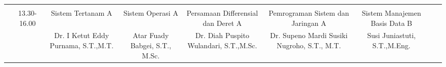 \begin{table}[]
\begin{tabular}{|c|c|ccccccc|}
                          &                              & \multicolumn{1}{c|}{}                                             & \multicolumn{1}{c|}{}                                              & \multicolumn{1}{c|}{}                                         & \multicolumn{1}{c|}{}                                                & \multicolumn{1}{c|}{}                                             & \multicolumn{1}{c|}{}                                              &                                                 \\ \cline{2-9} 
                          & \multirow{2}{*}{13.30-16.00} & \multicolumn{1}{c|}{Sistem Tertanam A}                            & \multicolumn{1}{c|}{Sistem Operasi A}                              & \multicolumn{1}{c|}{Persamaan   Differensial dan Deret A}     & \multicolumn{1}{c|}{Pemrograman Sistem   dan Jaringan A}             & \multicolumn{1}{c|}{Sistem Manajemen   Basis Data B}              & \multicolumn{1}{c|}{}                                              &                                                 \\ \cline{3-9} 
                          &                              & \multicolumn{1}{c|}{Dr. I Ketut Eddy Purnama, S.T.,M.T.}          & \multicolumn{1}{c|}{Atar Fuady Babgei,   S.T., M.Sc.}              & \multicolumn{1}{c|}{Dr. Diah Puspito   Wulandari, S.T.,M.Sc.} & \multicolumn{1}{c|}{Dr. Supeno Mardi   Susiki Nugroho, S.T., M.T.}   & \multicolumn{1}{c|}{Susi Juniastuti,   S.T.,M.Eng.}               & \multicolumn{1}{c|}{}                                              &                                                 \\ \hline
  \end{tabular}
  \end{table}
